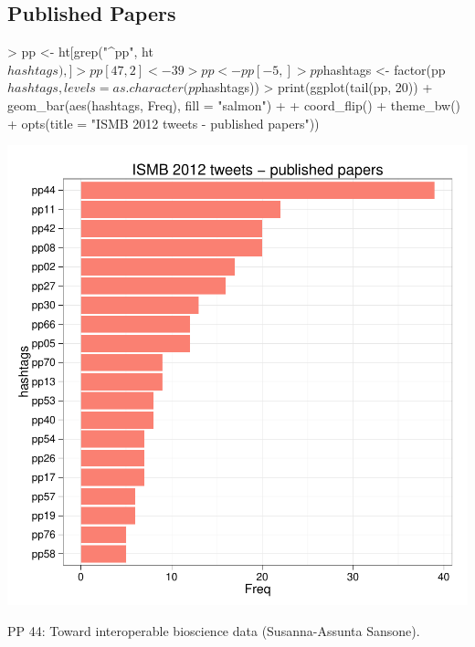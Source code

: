 \documentclass[a4paper,10pt]{article}
\begin{document}
\subsection{Published Papers}
\begin{center}
\begin{Schunk}
\begin{Sinput}
> pp <- ht[grep("^pp", ht$hashtags),]
> pp[47,2] <- 39
> pp <- pp[-5,]
> pp$hashtags <- factor(pp$hashtags, levels = as.character(pp$hashtags))
> print(ggplot(tail(pp, 20)) + geom_bar(aes(hashtags, Freq), fill = "salmon") + 
+   coord_flip() + theme_bw() + opts(title = "ISMB 2012 tweets - published papers"))
\end{Sinput}
\end{Schunk}
\includegraphics{ismb-006}
\end{center}

PP 44: Toward interoperable bioscience data (Susanna-Assunta Sansone).

\newpage
\end{document}
